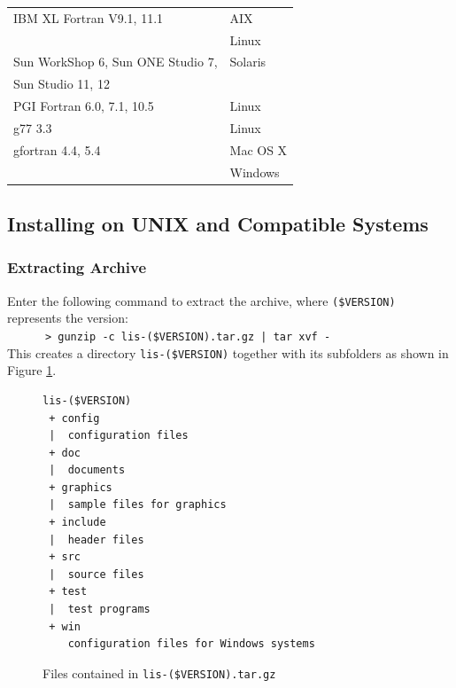 \documentclass[a4paper]{article}
\begin{document}
\begin{table}[htbp]
\begin{center}
{\begin{tabular}{l|l}
\hline
IBM XL Fortran V9.1, 11.1                  & AIX     \\
                                           & Linux   \\
\hline
Sun WorkShop 6, Sun ONE Studio 7,          & Solaris \\
Sun Studio 11, 12                          &         \\
\hline
PGI Fortran 6.0, 7.1, 10.5                 & Linux \\
\hline
g77 3.3                                    & Linux \\
gfortran 4.4, 5.4                          & Mac OS X \\
                                           & Windows \\
\hline
\end{tabular}
}
\end{center}
\end{table} 

\subsection{Installing on UNIX and Compatible Systems}
\subsubsection{Extracting Archive}
Enter the following command to extract the archive, 
where \verb|($VERSION)| represents the version:\\
 \verb&      > gunzip -c lis-($VERSION).tar.gz | tar xvf - &\\
This creates a directory {\tt lis-(\$VERSION)} together 
with its subfolders as shown in Figure \ref{listargz}.

\begin{figure}[htbp]
\begin{center}
\begin{verbatim}
lis-($VERSION)
 + config
 |  configuration files
 + doc
 |  documents
 + graphics
 |  sample files for graphics
 + include
 |  header files
 + src
 |  source files
 + test
 |  test programs
 + win
    configuration files for Windows systems
\end{verbatim}
\end{center}
\caption{Files contained in {\tt lis-(\$VERSION).tar.gz}}
\label{listargz}
\end{figure}
\end{document}
